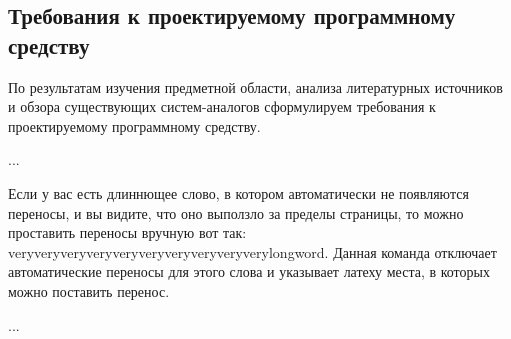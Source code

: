 \subsection{Требования к проектируемому программному средству}
\label{sec:analysis:specification}

По результатам изучения предметной области, анализа литературных источников и обзора существующих систем-аналогов сформулируем требования к проектируемому программному средству.

...

Если у вас есть длиннющее слово, в котором автоматически не появляются переносы, и вы видите, что оно выползло за пределы страницы, то можно проставить переносы вручную вот так: very\-very\-very\-very\-very\-very\-very\-very\-very\-very\-long\-word. Данная команда отключает автоматические переносы для этого слова и указывает латеху места, в которых можно поставить перенос.

...
